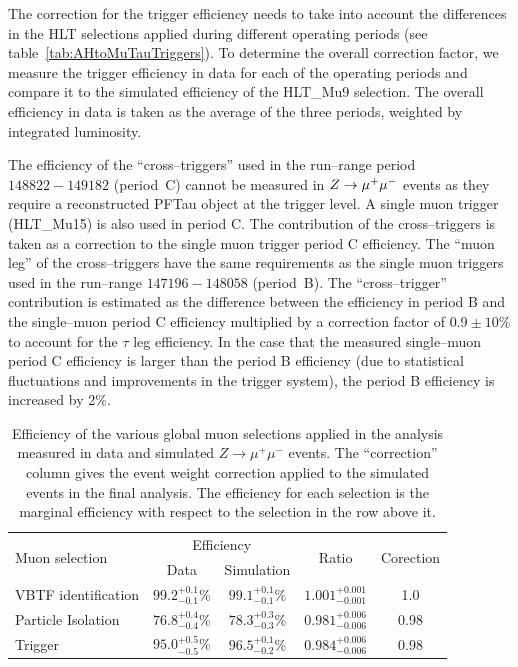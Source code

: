 The correction for the trigger efficiency needs to take into account the
differences in the HLT selections applied during different operating periods
(see table~\ref{tab:AHtoMuTauTriggers}).  To determine the overall correction
factor, we measure the trigger efficiency in data for each of the operating
periods and compare it to the simulated efficiency of the HLT\_Mu9 selection.
The overall efficiency in data is taken as the average of the three periods,
weighted by integrated luminosity.

The efficiency of the ``cross--triggers'' used in the run--range period 
$148822-149182$ (period~C) cannot be measured in $Z\to\mu^+\mu^-$ events as they
require a reconstructed PFTau object at the trigger level.  A single muon trigger
(HLT\_Mu15) is also used in period C.  The contribution of the cross--triggers
is taken as a correction to the single muon trigger period C efficiency. The
``muon leg'' of the cross--triggers have the same requirements as the single
muon triggers used in the run--range $147196-148058$ (period~B).  The
``cross--trigger'' contribution is estimated as the difference between the
efficiency in period B and the single--muon period C efficiency multiplied by a
correction factor of $0.9 \pm 10\%$ to account for the $\tau$ leg efficiency.
In the case that the measured single--muon period C efficiency is larger than
the period B efficiency (due to statistical fluctuations and improvements in the
trigger system), the period B efficiency is increased by 2\%.

\begin{table}[t]
\begin{center}
\begin{tabular}{|l|c|c|c|c|}
\hline
\multirow{2}{*}{Muon selection} &  \multicolumn{2}{|c|}{Efficiency} & \multirow{2}{*}{Ratio} & \multirow{2}{*}{Corection} \\ 
&  Data  &          Simulation &      &      \\ 
\hline
VBTF identification &   $99.2^{+0.1}_{-0.1}$\%  &  $99.1^{+0.1}_{-0.1}$\% & $1.001^{+0.001}_{-0.001}$ & 1.0\\
Particle Isolation  &  $76.8^{+0.4}_{-0.4}$\% &  $78.3^{+0.3}_{-0.3}$\% & $0.981^{+0.006}_{-0.006}$ & 0.98 \\
Trigger             &   $95.0^{+0.5}_{-0.5}$\% & $96.5^{+0.1}_{-0.2}$\% & $0.984^{+0.006}_{-0.006}$ & 0.98 \\
\hline
\end{tabular}
\end{center}
\begin{center}
\caption[Muon trigger, identification, and isolation correction
factors]{Efficiency of the various global muon selections applied in the
analysis measured in data and simulated $Z\rightarrow\mu^+\mu^-$ events.  The
``correction'' column gives the event weight correction applied to the simulated
events in the final analysis.  The efficiency for each selection is the marginal
efficiency with respect to the selection in the row above it.  }

\label{tab:muonTagAndProbeResults}
\end{center}
\end{table}

